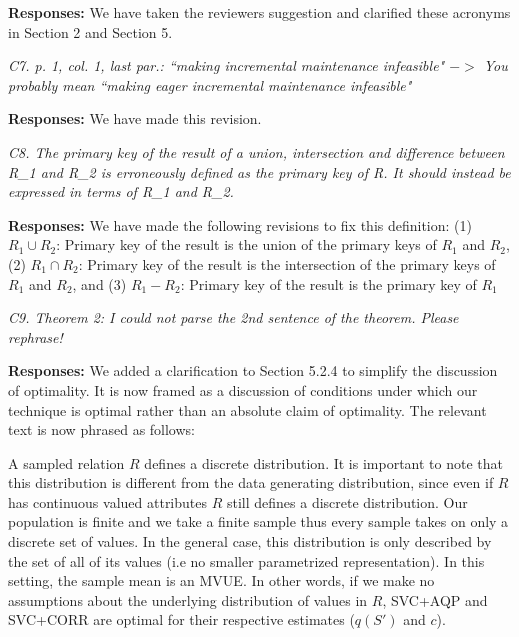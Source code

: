 \vspace{.25em}

{\bf Responses:} We have taken the reviewers suggestion and clarified these acronyms in Section 2 and Section 5.

\vspace{1em}
\emph{C7. p. 1, col. 1, last par.: ``making incremental maintenance infeasible" $->$ You probably mean ``making eager incremental maintenance infeasible"}

\vspace{.25em}

{\bf Responses:} We have made this revision.

\vspace{1em}
\emph{C8. The primary key of the result of a union, intersection and difference between R\_1 and R\_2 is erroneously defined as the primary key of R. It should instead be expressed in terms of R\_1 and R\_2.}

\vspace{.25em}

{\bf Responses:} We have made the following revisions to fix this definition:
(1) $R_1 \cup R_2$: Primary key of the result is the union of the primary keys of $R_1$ and $R_2$, (2) $R_1 \cap R_2$: Primary key of the result is the intersection of the primary keys of $R_1$ and $R_2$, and (3) $R_1 - R_2$: Primary key of the result is the primary key of $R_1$


\vspace{1em}
\emph{C9. Theorem 2: I could not parse the 2nd sentence of the theorem. Please rephrase!}

\vspace{.25em}

{\bf Responses:} We added a clarification to Section 5.2.4 to simplify the discussion of optimality. It is now framed as a discussion of conditions under which our technique is optimal rather than an absolute claim of optimality. The relevant text is now phrased as follows:
\begin{displayquote}
A sampled relation $R$ defines a discrete distribution. It is important to note that this distribution is different from the data generating distribution, since even if $R$ has continuous valued attributes $R$ still defines a discrete distribution. Our population is finite and we take a finite sample thus every sample takes on only a discrete set of values. In the general case, this distribution is only described by the set of all of its values (i.e no smaller parametrized representation). In this setting, the sample mean is an MVUE. In other words, if we make no assumptions about the underlying distribution of values in $R$, SVC+AQP and SVC+CORR are optimal for their respective estimates ($q(S')$ and $c$).
\end{displayquote}


